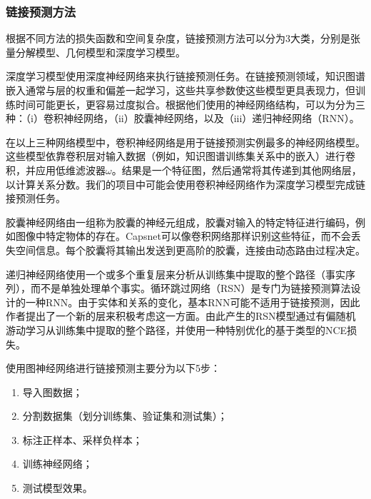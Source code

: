 \documentclass[twocolumn]{article}
\begin{document}
\subsubsection{链接预测方法}
根据不同方法的损失函数和空间复杂度，链接预测方法可以分为3大类，分别是张量分解模型、几何模型和深度学习模型\cite{link_prediction}。\par
深度学习模型使用深度神经网络来执行链接预测任务。在链接预测领域，知识图谱嵌入通常与层的权重和偏差一起学习，这些共享参数使这些模型更具表现力，但训练时间可能更长，更容易过度拟合。根据他们使用的神经网络结构，可以为分为三种：（i）卷积神经网络，（ii）胶囊神经网络，以及（iii）递归神经网络（RNN）\cite{link_prediction}。\par
在以上三种网络模型中，卷积神经网络是用于链接预测实例最多的神经网络模型。这些模型依靠卷积层对输入数据（例如，知识图谱训练集关系中的嵌入）进行卷积，并应用低维滤波器$\omega$。结果是一个特征图，然后通常将其传递到其他网络层，以计算关系分数。我们的项目中可能会使用卷积神经网络作为深度学习模型完成链接预测任务。\par
胶囊神经网络由一组称为胶囊的神经元组成，胶囊对输入的特定特征进行编码，例如图像中特定物体的存在。Capsnet可以像卷积网络那样识别这些特征，而不会丢失空间信息。每个胶囊将其输出发送到更高阶的胶囊，连接由动态路由过程决定。\par
递归神经网络使用一个或多个重复层来分析从训练集中提取的整个路径（事实序列），而不是单独处理单个事实。循环跳过网络（RSN）是专门为链接预测算法设计的一种RNN。由于实体和关系的变化，基本RNN可能不适用于链接预测，因此作者提出了一个新的层来积极考虑这一方面。由此产生的RSN模型通过有偏随机游动学习从训练集中提取的整个路径，并使用一种特别优化的基于类型的NCE损失。\par
使用图神经网络进行链接预测主要分为以下5步：\par
\begin{enumerate}
	\item 导入图数据；
	\item 分割数据集（划分训练集、验证集和测试集）；
	\item 标注正样本、采样负样本；
	\item 训练神经网络；
	\item 测试模型效果。
\end{enumerate}\par
\end{document}
